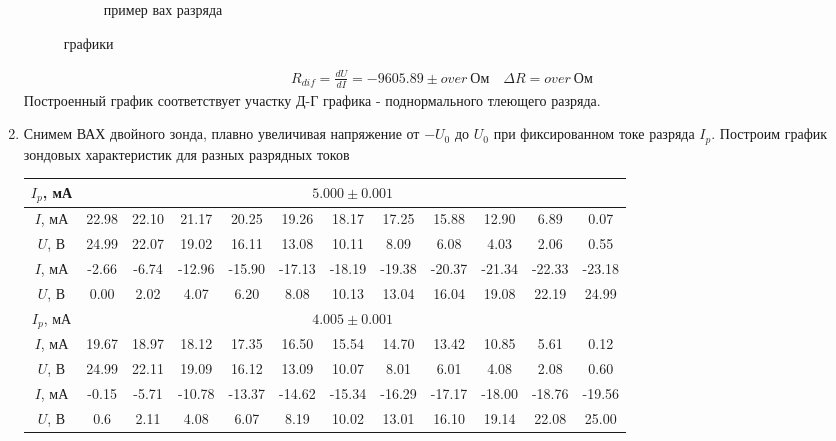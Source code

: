 \documentclass[a4paper, 12pt]{article}
\begin{document}
\begin{enumerate}
\begin{figure}[htbp]
\begin{subfigure}{0.45\textwidth}
            \caption{пример вах разряда}
            \label{пример вах газового разряда}
        \end{subfigure}
        \caption{графики}
        \label{графики}
    \end{figure}
    \begin{align}
        R_{dif} = \frac{dU}{dI} = -9605.89 \pm over\ \text{Ом} \quad \Delta R = over\ \text{Ом}
    \end{align}
    Построенный график соответствует участку Д-Г графика - поднормального тлеющего разряда.
    \item Снимем ВАХ двойного зонда, плавно увеличивая напряжение от $-U_{0}$ до $U_{0}$ при фиксированном токе разряда $I_{p}$. Построим график зондовых характеристик для разных разрядных токов
    \begin{center}
        \centering
        \begin{tabular}{|c|c|c|c|c|c|c|c|c|c|c|c|}
            \hline
            $I_{p}$, мА & \multicolumn{11}{|c|}{$5.000\pm 0.001$}\\
            \hline
            $I$, мА & 22.98 & 22.10 & 21.17 & 20.25 & 19.26 & 18.17 & 17.25 & 15.88 & 12.90 & 6.89 & 0.07\\
            $U$, В & 24.99 & 22.07 & 19.02 & 16.11 & 13.08 & 10.11 & 8.09 & 6.08 & 4.03 & 2.06 & 0.55\\
            \hline
            $I$, мА & -2.66 & -6.74 & -12.96 & -15.90 & -17.13 & -18.19 & -19.38 & -20.37 & -21.34 & -22.33 & -23.18\\
            $U$, В & 0.00 & 2.02 & 4.07 & 6.20 & 8.08 & 10.13 & 13.04 & 16.04 & 19.08 & 22.19 & 24.99\\
            \hline
            $I_{p}$, мА & \multicolumn{11}{|c|}{$4.005\pm 0.001$}\\
            \hline
            $I$, мА & 19.67 & 18.97 & 18.12 & 17.35 & 16.50 & 15.54 & 14.70 & 13.42 & 10.85 & 5.61 & 0.12\\
            $U$, В & 24.99 & 22.11 & 19.09 & 16.12 & 13.09 & 10.07 & 8.01 & 6.01 & 4.08 & 2.08 & 0.60\\
            \hline
            $I$, мА & -0.15 & -5.71 & -10.78 & -13.37 & -14.62 & -15.34 & -16.29 & -17.17 & -18.00 & -18.76 & -19.56\\
            $U$, В & 0.6 & 2.11 & 4.08 & 6.07 & 8.19 & 10.02 & 13.01 & 16.10 & 19.14 & 22.08 & 25.00\\

\end{tabular}
\end{center}
\end{enumerate}
\end{document}
